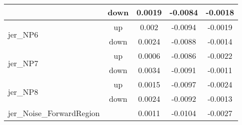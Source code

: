 \begin{table}[h!]
\begin{tabular}{lcccc}
                                       & down &     0.0019     &     -0.0084     &     -0.0018       \\ \hline
\multirow{2}{*}{jer\_NP6}      & up   &     0.002     &     -0.0094     &     -0.0019      \\
                                       & down &     0.0024     &     -0.0088     &     -0.0014       \\ \hline
\multirow{2}{*}{jer\_NP7}      & up   &     0.0006     &     -0.0086     &     -0.0022      \\
                                       & down &     0.0034     &     -0.0091     &     -0.0011       \\ \hline
\multirow{2}{*}{jer\_NP8}      & up   &     0.0015     &     -0.0097     &     -0.0024      \\
                                       & down &     0.0024     &     -0.0092     &     -0.0013       \\ \hline
\multirow{2}{*}{jer\_Noise\_ForwardRegion}  &  & \multirow{2}{*}{0.0011} & \multirow{2}{*}{-0.0104}  & \multirow{2}{*}{-0.0027}  \\  \\ \hline
\end{tabular}

\label{tab:systUnc_lep_f0}
\end{table}

